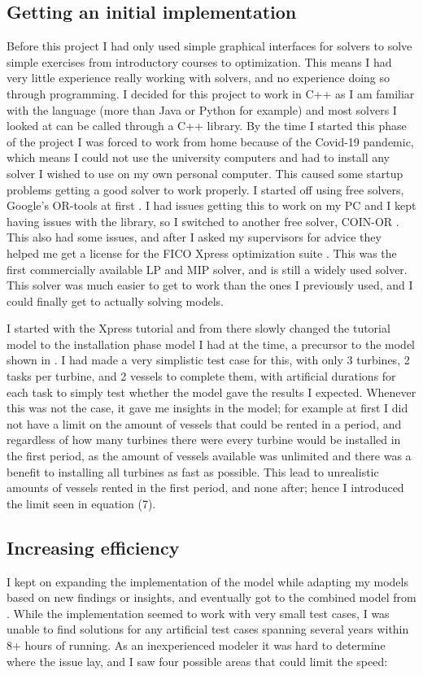 \documentclass[a4paper,12pt]{article}
\begin{document}
\subsection{Getting an initial implementation}
Before this project I had only used simple graphical interfaces for solvers to solve simple exercises from introductory courses to optimization. This means I had very little experience really working with solvers, and no experience doing so through programming. I decided for this project to work in C++ as I am familiar with the language (more than Java or Python for example) and most solvers I looked at can be called through a C++ library. By the time I started this phase of the project I was forced to work from home because of the Covid-19 pandemic, which means I could not use the university computers and had to install any solver I wished to use on my own personal computer. This caused some startup problems getting a good solver to work properly. I started off using free solvers, Google's OR-tools at first \cite{ortools}. I had issues getting this to work on my PC and I kept having issues with the library, so I switched to another free solver, COIN-OR \cite{coinor}. This also had some issues, and after I asked my supervisors for advice they helped me get a license for the FICO Xpress optimization suite \cite{ficoxp}. This was the first commercially available LP and MIP solver, and is still a widely used solver. This solver was much easier to get to work than the ones I previously used, and I could finally get to actually solving models. 

I started with the Xpress tutorial and from there slowly changed the tutorial model to the installation phase model I had at the time, a precursor to the model shown in . I had made a very simplistic test case for this, with only 3 turbines, 2 tasks per turbine, and 2 vessels to complete them, with artificial durations for each task to simply test whether the model gave the results I expected. Whenever this was not the case, it gave me insights in the model; for example at first I did not have a limit on the amount of vessels that could be rented in a period, and regardless of how many turbines there were every turbine would be installed in the first period, as the amount of vessels available was unlimited and there was a benefit to installing all turbines as fast as possible. This lead to unrealistic amounts of vessels rented in the first period, and none after; hence I introduced the limit seen in equation (7). 

\subsection{Increasing efficiency}
I kept on expanding the implementation of the model while adapting my models based on new findings or insights, and eventually got to the combined model from . While the implementation seemed to work with very small test cases, I was unable to find solutions for any artificial test cases spanning several years within 8+ hours of running. As an inexperienced modeler it was hard to determine where the issue lay, and I saw four possible areas that could limit the speed:
\end{document}
